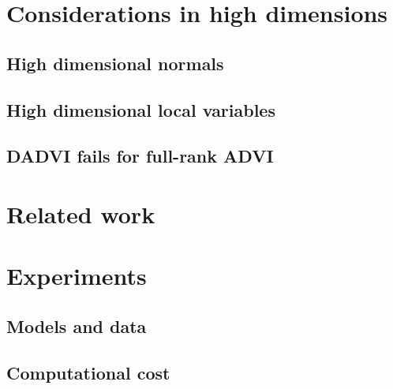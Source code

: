 \documentclass[twoside,11pt]{article}
\begin{document}

\section{Considerations in high dimensions}\label{sec:high_dim}


\subsection{High dimensional normals}\label{sec:high_dim_normal}


\subsection{High dimensional local variables}\label{sec:high_dim_global_local}


\subsection{DADVI fails for full-rank ADVI}
\label{sec:dadvi_full_rank}



\section{Related work}\label{sec:related_work}






\section{Experiments}\label{sec:experiments}


\subsection{Models and data} \label{sec:models_data}


\subsection{Computational cost}\label{sec:experiments_runtime}

\end{document}
